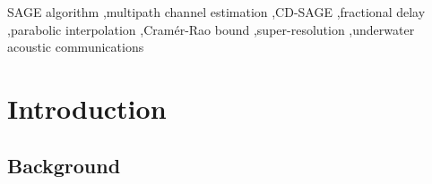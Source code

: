 \documentclass[a4paper,fleqn]{cas-dc}
\begin{document}

\begin{highlights}
\item 
\item 
\item 
\end{highlights}



\begin{keywords}
 SAGE algorithm \sep multipath channel estimation \sep CD-SAGE \sep fractional delay \sep parabolic interpolation \sep Cram\'{e}r-Rao bound \sep super-resolution \sep underwater acoustic communications
\end{keywords}

\maketitle






\section{Introduction}
\label{sec:intro}

\subsection{Background}
\end{document}
